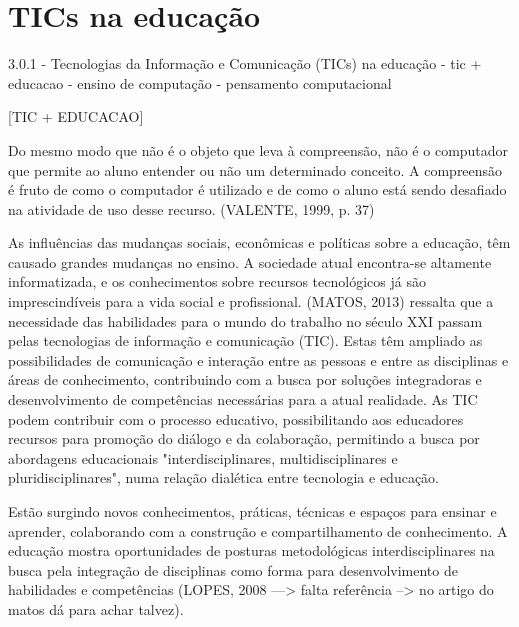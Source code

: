 \section{TICs na educação}%
 


3.0.1 - Tecnologias da Informação e Comunicação (TICs) na educação
		- tic + educacao
		- ensino de computação 
		- pensamento computacional
 
[TIC + EDUCACAO]
	
	Do mesmo modo que não é o objeto que leva à compreensão, não é o computador que permite ao aluno entender ou não um determinado conceito. A compreensão é fruto de como o computador é utilizado e de como o aluno está sendo desafiado na atividade de uso desse recurso. (VALENTE, 1999, p. 37)
 
	As influências das mudanças sociais, econômicas e políticas sobre a educação, têm causado grandes mudanças no ensino. A sociedade atual encontra-se altamente informatizada, e os conhecimentos sobre recursos tecnológicos já são imprescindíveis para a vida social e profissional.  (MATOS, 2013) ressalta que a necessidade das habilidades para o mundo do trabalho no século XXI passam pelas tecnologias de informação e comunicação (TIC). Estas têm ampliado as possibilidades de comunicação e interação entre as pessoas e entre as disciplinas e áreas de conhecimento, contribuindo com a busca por soluções integradoras e desenvolvimento de competências necessárias para a atual realidade. As TIC podem contribuir com o processo educativo, possibilitando aos educadores recursos para promoção do diálogo e da colaboração, permitindo a busca por abordagens educacionais "interdisciplinares, multidisciplinares e pluridisciplinares", numa relação dialética entre tecnologia e educação.
    
    
	Estão surgindo novos conhecimentos, práticas, técnicas e espaços para ensinar e aprender, colaborando com a construção e compartilhamento de conhecimento. A educação mostra oportunidades de posturas metodológicas interdisciplinares na busca pela integração de disciplinas como forma para desenvolvimento de habilidades e competências (LOPES, 2008 ---> falta referência --> no artigo do matos dá para achar talvez).
    
